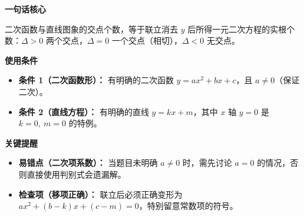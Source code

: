 \begin{summarybox}
	\textbf{\textcolor{CSummary}{一句话核心}}

	二次函数与直线图象的交点个数，等于联立消去 $y$ 后所得一元二次方程的实根个数：$\Delta>0$ 两个交点，$\Delta=0$ 一个交点（相切），$\Delta<0$ 无交点。

	\medskip
	\textbf{\textcolor{CSummary}{使用条件}}
	\begin{itemize}[leftmargin=*, itemsep=0.5em, topsep=0.4em]
		\item \textbf{条件 1（二次函数形）：} 有明确的二次函数 $y=ax^{2}+bx+c$，且 $a\neq0$（保证二次）。
		\item \textbf{条件 2（直线方程）：} 有明确的直线 $y=kx+m$，其中 $x$ 轴 $y=0$ 是 $k=0,\ m=0$ 的特例。
	\end{itemize}

	\medskip
	\textbf{\textcolor{CSummary}{关键提醒}}
	\begin{itemize}[leftmargin=*, itemsep=0.5em, topsep=0.4em]
		\item \textbf{易错点（二次项系数）：} 当题目未明确 $a\neq0$ 时，需先讨论 $a=0$ 的情况，否则直接使用判别式会遗漏解。
		\item \textbf{检查项（移项正确）：} 联立后必须正确变形为 $ax^{2}+(b-k)x+(c-m)=0$，特别留意常数项的符号。
	\end{itemize}
\end{summarybox}